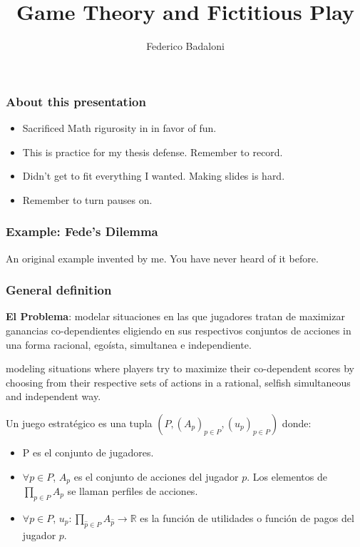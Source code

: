 \documentclass[pdf]{beamer}
\title{Game Theory and Fictitious Play}
\author[]{Federico Badaloni}
\begin{document}
\begin{frame}
    \frametitle{About this presentation}
    \begin{itemize}
        \item Sacrificed Math rigurosity in in favor of fun.
        \item This is practice for my thesis defense. Remember to record.
        \item Didn't get to fit everything I wanted. Making slides is hard.
        \item \pause Remember to turn pauses on.
    \end{itemize}

\end{frame}

\begin{frame}
    \frametitle{Example: Fede's Dilemma}
    An original example invented by me. You have never heard of it before.

\end{frame}

\begin{frame}
    \frametitle{General definition}
    \textbf{El Problema}: modelar situaciones en las que jugadores tratan de maximizar ganancias co-dependientes eligiendo en sus respectivos conjuntos de acciones in una forma racional, egoísta, simultanea e independiente. 
    
    modeling situations where players try to maximize their co-dependent scores by choosing from their respective
    sets of actions in a rational, selfish simultaneous and independent way.
    
    \pause
    \begin{definition}
        Un juego estratégico es una tupla $(P, (A_p)_{p \in P}, (u_p)_{p \in P})$ donde:
        \begin{itemize}
            \item P es el conjunto de jugadores.
            \item $\forall p \in P$, $A_p$ es el conjunto de acciones del jugador $p$. Los elementos de $\prod\limits_{p \in P} A_p$ se llaman perfiles de acciones.
            \item $\forall p \in P$, $u_p: \prod\limits_{\widehat{p} \in P} A_{\widehat{p}} \rightarrow \mathbb{R}$ es la función de utilidades o función de pagos del jugador $p$.
        \end{itemize}
    \end{definition}

\end{frame}
\end{document}

